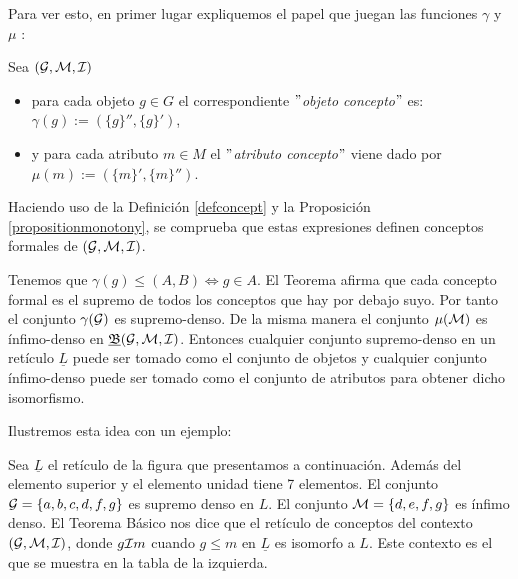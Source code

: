 \documentclass[oneside,openright,titlepage,numbers=noenddot,openany,headinclude,footinclude=true,
cleardoublepage=empty,abstractoff,BCOR=5mm,paper=a4,fontsize=12pt,main=spanish]{scrreprt}
\begin{document}
Para ver esto, en primer lugar expliquemos el papel que juegan las funciones $\gamma$ y $\mu$ \cite{conceptualexploration}:

Sea $(\mathcal{G},\mathcal{M},\mathcal{I})$
\begin{itemize} 
    \item para cada objeto $g \in G$ el correspondiente $"$\textit{objeto concepto}$"$ es: $\gamma (g) := (\{g\}'',\{g\}')$,
    \item y para cada atributo $m \in M$ el $"$\textit{atributo concepto}$"$ viene dado por $\mu(m) :=(\{m\}',\{m\}'').$
\end{itemize}


Haciendo uso de la Definición \ref{defconcept}  y la Proposición \ref{propositionmonotony}, se comprueba que estas expresiones definen conceptos formales de $(\mathcal{G},\mathcal{M},\mathcal{I})$.

Tenemos que $\gamma(g) \leq (A,B) \Longleftrightarrow g \in A$. El Teorema afirma que cada concepto formal es el supremo de todos los conceptos que hay por debajo suyo. Por tanto el conjunto $\gamma(\mathcal{G})$ es supremo-denso. De la misma manera el conjunto $\mu(\mathcal{M})$ es ínfimo-denso en $\underline{\mathfrak{B}}(\mathcal{G},\mathcal{M},\mathcal{I})$. Entonces cualquier conjunto supremo-denso en un  retículo $\underline{L}$ puede ser tomado como el conjunto de objetos y cualquier conjunto ínfimo-denso puede ser tomado como el conjunto de atributos para obtener dicho isomorfismo.

Ilustremos esta idea con un ejemplo:

Sea $\underline{L}$ el retículo de la figura que presentamos a continuación. Además del elemento superior y el elemento unidad tiene 7 elementos. El conjunto $\mathcal{G}=\{a,b,c,d,f,g\}$ es supremo denso en $L$. El conjunto $\mathcal{M}=\{d,e,f,g\}$ es ínfimo denso. El Teorema Básico nos dice que el retículo de conceptos del contexto $(\mathcal{G},\mathcal{M},\mathcal{I})$, donde $g \mathcal{I} m$ cuando $g\leq m$ en $\underline{L}$ es isomorfo a $L$. Este contexto es el que se muestra en la tabla de la izquierda. 
\end{document}
